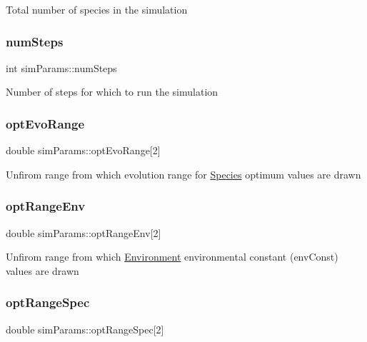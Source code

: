 Total number of species in the simulation \mbox{\label{structsimParams_a027234312109ab21e3f8dacda4039c9f}} 
\subsubsection{\texorpdfstring{num\+Steps}{numSteps}}
{\footnotesize\ttfamily int sim\+Params\+::num\+Steps}

Number of steps for which to run the simulation \mbox{\label{structsimParams_a2822e99362ed71f123e812a8fd9ad443}} 
\subsubsection{\texorpdfstring{opt\+Evo\+Range}{optEvoRange}}
{\footnotesize\ttfamily double sim\+Params\+::opt\+Evo\+Range\mbox{[}2\mbox{]}}

Unfirom range from which evolution range for \hyperlink{classSpecies}{Species} optimum values are drawn \mbox{\label{structsimParams_ab59d469330753aebd7ce7ab893a6eda4}} 
\subsubsection{\texorpdfstring{opt\+Range\+Env}{optRangeEnv}}
{\footnotesize\ttfamily double sim\+Params\+::opt\+Range\+Env\mbox{[}2\mbox{]}}

Unfirom range from which \hyperlink{classEnvironment}{Environment} environmental constant (env\+Const) values are drawn \mbox{\label{structsimParams_a169d5e6c66da8b477bb7e384fe4c90b8}} 
\subsubsection{\texorpdfstring{opt\+Range\+Spec}{optRangeSpec}}
{\footnotesize\ttfamily double sim\+Params\+::opt\+Range\+Spec\mbox{[}2\mbox{]}}

